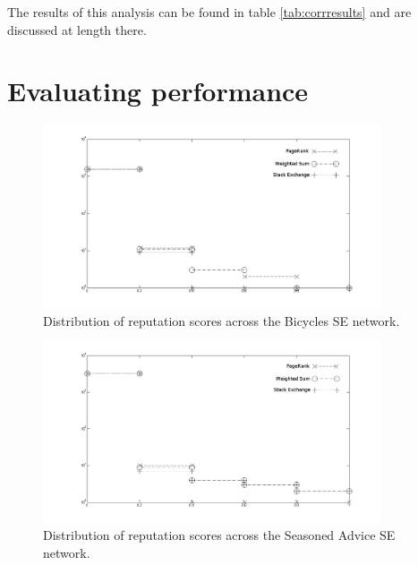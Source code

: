 \documentclass[]{final_report}
\begin{document}

The results of this analysis can be found in table \ref{tab:corrresults} and are discussed at length there.

\section{Evaluating performance}


\begin{figure}[ht!]
\centering
\includegraphics[width=100mm]{chap3/bicycles_hist.png}
\caption{Distribution of reputation scores across the Bicycles SE network.}\label{fig:histogram}
\end{figure}\label{gra:bicyclehist}

\begin{figure}[ht!]
\centering
\includegraphics[width=100mm]{chap3/cooking_hist.png}
\caption{Distribution of reputation scores across the Seasoned Advice SE network.}
\end{figure}\label{gra:cookinghist}
\end{document}
